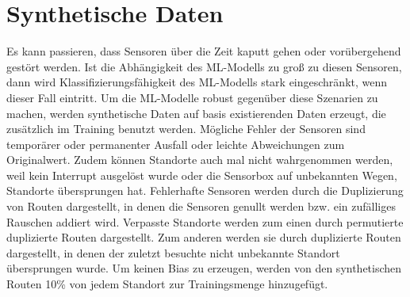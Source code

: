 \section{Synthetische Daten}
Es kann passieren, dass Sensoren über die Zeit kaputt gehen oder vorübergehend gestört werden.
Ist die Abhängigkeit des ML-Modells zu groß zu diesen Sensoren, dann wird Klassifizierungsfähigkeit des ML-Modells stark eingeschränkt, wenn dieser Fall eintritt.
Um die ML-Modelle robust gegenüber diese Szenarien zu machen, werden synthetische Daten auf basis existierenden Daten erzeugt, die zusätzlich im Training benutzt werden.
\newline
\newline
Mögliche Fehler der Sensoren sind temporärer oder permanenter Ausfall oder leichte Abweichungen zum Originalwert.
Zudem können Standorte auch mal nicht wahrgenommen werden, weil kein Interrupt ausgelöst wurde oder die Sensorbox
auf unbekannten Wegen, Standorte übersprungen hat.
\newline
\newline
Fehlerhafte Sensoren werden durch die Duplizierung von Routen dargestellt, in denen die Sensoren genullt werden bzw. ein zufälliges Rauschen addiert wird.
Verpasste Standorte werden zum einen durch permutierte duplizierte Routen dargestellt.
Zum anderen werden sie durch duplizierte Routen dargestellt, in denen der zuletzt besuchte nicht unbekannte Standort übersprungen wurde.
Um keinen Bias zu erzeugen, werden von den synthetischen Routen 10\% von jedem Standort zur Trainingsmenge hinzugefügt.